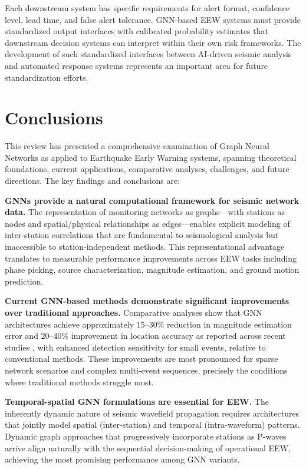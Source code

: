 \documentclass[review,authoryear]{elsarticle}
\begin{document}
Each downstream system has specific requirements for alert format, confidence level, lead time, and false alert tolerance. GNN-based EEW systems must provide standardized output interfaces with calibrated probability estimates that downstream decision systems can interpret within their own risk frameworks. The development of such standardized interfaces between AI-driven seismic analysis and automated response systems represents an important area for future standardization efforts.

\section{Conclusions}
\label{sec:conclusions}

This review has presented a comprehensive examination of Graph Neural Networks as applied to Earthquake Early Warning systems, spanning theoretical foundations, current applications, comparative analyses, challenges, and future directions. The key findings and conclusions are:

\textbf{GNNs provide a natural computational framework for seismic network data.} The representation of monitoring networks as graphs---with stations as nodes and spatial/physical relationships as edges---enables explicit modeling of inter-station correlations that are fundamental to seismological analysis but inaccessible to station-independent methods. This representational advantage translates to measurable performance improvements across EEW tasks including phase picking, source characterization, magnitude estimation, and ground motion prediction.

\textbf{Current GNN-based methods demonstrate significant improvements over traditional approaches.} Comparative analyses show that GNN architectures achieve approximately 15--30\% reduction in magnitude estimation error and 20--40\% improvement in location accuracy as reported across recent studies \citep{mcbrearty2023earthquake, vandenende2020automated, bloemheuvel2022graph, jozinovic2022ground}, with enhanced detection sensitivity for small events, relative to conventional methods. These improvements are most pronounced for sparse network scenarios and complex multi-event sequences, precisely the conditions where traditional methods struggle most.

\textbf{Temporal-spatial GNN formulations are essential for EEW.} The inherently dynamic nature of seismic wavefield propagation requires architectures that jointly model spatial (inter-station) and temporal (intra-waveform) patterns. Dynamic graph approaches that progressively incorporate stations as P-waves arrive align naturally with the sequential decision-making of operational EEW, achieving the most promising performance among GNN variants.
\end{document}

